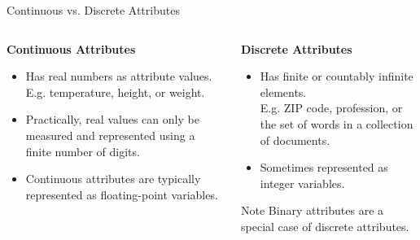 \begin{frame}{Continuous vs. Discrete Attributes}
  \begin{columns}[t]
    \begin{column}{0.5\columnwidth}
      \centering \textbf{Continuous Attributes}
    \begin{itemize}
    \item Has real numbers as attribute values.\\
      E.g. temperature, height, or weight.
    \item Practically, real values can only be measured and represented using a finite number of digits.
    \item Continuous attributes are typically represented as floating-point variables.
    \end{itemize}
    \end{column}
    \begin{column}{0.5\columnwidth}
      \centering \textbf{Discrete Attributes}
      \begin{itemize}
    \item Has finite or countably infinite elements.\\
      E.g. ZIP code, profession, or the set of words in a collection of documents.
    \item Sometimes represented as integer variables.
    \end{itemize}
    \begin{alertblock}{Note}
      Binary attributes are a special case of discrete attributes.
    \end{alertblock}
    \end{column}
  \end{columns}
\end{frame}
